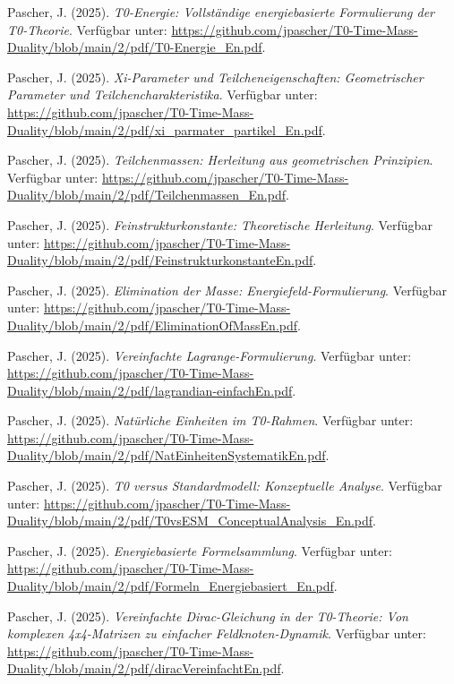 \documentclass[12pt,a4paper]{article}
\numberwithin{equation}{section}
\begin{document}
	\begin{thebibliography}{99}
		
		Pascher, J. (2025). \emph{T0-Energie: Vollständige energiebasierte Formulierung der T0-Theorie}. Verfügbar unter: \url{https://github.com/jpascher/T0-Time-Mass-Duality/blob/main/2/pdf/T0-Energie_En.pdf}.
		
		Pascher, J. (2025). \emph{Xi-Parameter und Teilcheneigenschaften: Geometrischer Parameter und Teilchencharakteristika}. Verfügbar unter: \url{https://github.com/jpascher/T0-Time-Mass-Duality/blob/main/2/pdf/xi_parmater_partikel_En.pdf}.
		
		Pascher, J. (2025). \emph{Teilchenmassen: Herleitung aus geometrischen Prinzipien}. Verfügbar unter: \url{https://github.com/jpascher/T0-Time-Mass-Duality/blob/main/2/pdf/Teilchenmassen_En.pdf}.
		
		Pascher, J. (2025). \emph{Feinstrukturkonstante: Theoretische Herleitung}. Verfügbar unter: \url{https://github.com/jpascher/T0-Time-Mass-Duality/blob/main/2/pdf/FeinstrukturkonstanteEn.pdf}.
		
		Pascher, J. (2025). \emph{Elimination der Masse: Energiefeld-Formulierung}. Verfügbar unter: \url{https://github.com/jpascher/T0-Time-Mass-Duality/blob/main/2/pdf/EliminationOfMassEn.pdf}.
		
		Pascher, J. (2025). \emph{Vereinfachte Lagrange-Formulierung}. Verfügbar unter: \url{https://github.com/jpascher/T0-Time-Mass-Duality/blob/main/2/pdf/lagrandian-einfachEn.pdf}.
		
		Pascher, J. (2025). \emph{Natürliche Einheiten im T0-Rahmen}. Verfügbar unter: \url{https://github.com/jpascher/T0-Time-Mass-Duality/blob/main/2/pdf/NatEinheitenSystematikEn.pdf}.
		
		Pascher, J. (2025). \emph{T0 versus Standardmodell: Konzeptuelle Analyse}. Verfügbar unter: \url{https://github.com/jpascher/T0-Time-Mass-Duality/blob/main/2/pdf/T0vsESM_ConceptualAnalysis_En.pdf}.
		
		Pascher, J. (2025). \emph{Energiebasierte Formelsammlung}. Verfügbar unter: \url{https://github.com/jpascher/T0-Time-Mass-Duality/blob/main/2/pdf/Formeln_Energiebasiert_En.pdf}.
		
		Pascher, J. (2025). \emph{Vereinfachte Dirac-Gleichung in der T0-Theorie: Von komplexen 4x4-Matrizen zu einfacher Feldknoten-Dynamik}. Verfügbar unter: \url{https://github.com/jpascher/T0-Time-Mass-Duality/blob/main/2/pdf/diracVereinfachtEn.pdf}.
		

\end{thebibliography}
\end{document}
